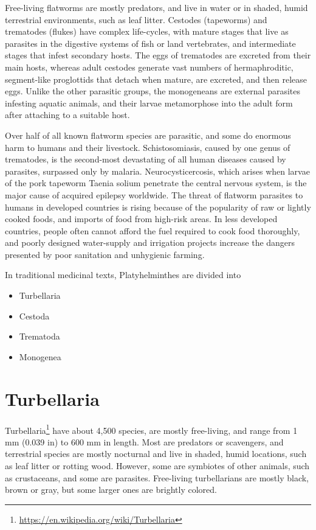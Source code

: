 \documentclass[]{book}
\providecommand{\tightlist}{%
  \setlength{\itemsep}{0pt}\setlength{\parskip}{0pt}}
\let\rmarkdownfootnote\footnote%
\def\footnote{\protect\rmarkdownfootnote}
\renewcommand{\href}[2]{#2\footnote{\url{#1}}}
\theoremstyle{definition}
\theoremstyle{definition}
\theoremstyle{definition}
\theoremstyle{remark}
\begin{document}
Free-living flatworms are mostly predators, and live in water or in
shaded, humid terrestrial environments, such as leaf litter. Cestodes
(tapeworms) and trematodes (flukes) have complex life-cycles, with
mature stages that live as parasites in the digestive systems of fish or
land vertebrates, and intermediate stages that infest secondary hosts.
The eggs of trematodes are excreted from their main hosts, whereas adult
cestodes generate vast numbers of hermaphroditic, segment-like
proglottids that detach when mature, are excreted, and then release
eggs. Unlike the other parasitic groups, the monogeneans are external
parasites infesting aquatic animals, and their larvae metamorphose into
the adult form after attaching to a suitable host.

Over half of all known flatworm species are parasitic, and some do
enormous harm to humans and their livestock. Schistosomiasis, caused by
one genus of trematodes, is the second-most devastating of all human
diseases caused by parasites, surpassed only by malaria.
Neurocysticercosis, which arises when larvae of the pork tapeworm Taenia
solium penetrate the central nervous system, is the major cause of
acquired epilepsy worldwide. The threat of flatworm parasites to humans
in developed countries is rising because of the popularity of raw or
lightly cooked foods, and imports of food from high-risk areas. In less
developed countries, people often cannot afford the fuel required to
cook food thoroughly, and poorly designed water-supply and irrigation
projects increase the dangers presented by poor sanitation and
unhygienic farming.

In traditional medicinal texts, Platyhelminthes are divided into

\begin{itemize}
\tightlist
\item
  Turbellaria
\item
  Cestoda
\item
  Trematoda
\item
  Monogenea
\end{itemize}

\section{Turbellaria}\label{turbellaria}

\href{https://en.wikipedia.org/wiki/Turbellaria}{Turbellaria} have about
4,500 species, are mostly free-living, and range from 1 mm (0.039 in) to
600 mm in length. Most are predators or scavengers, and terrestrial
species are mostly nocturnal and live in shaded, humid locations, such
as leaf litter or rotting wood. However, some are symbiotes of other
animals, such as crustaceans, and some are parasites. Free-living
turbellarians are mostly black, brown or gray, but some larger ones are
brightly colored.
\end{document}
